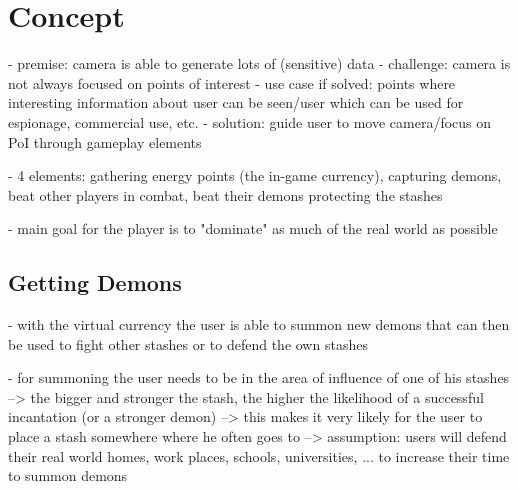 
\section{Concept}
\label{sec:concept}

- premise: camera is able to generate lots of (sensitive) data
- challenge: camera is not always focused on points of interest
- use case if solved: points where interesting information about user can be seen/user which can be used for espionage, commercial use, etc.
- solution: guide user to move camera/focus on PoI through gameplay elements



- 4 elements: gathering energy points (the in-game currency), capturing demons, beat other players in combat, beat their demons protecting the stashes

- main goal for the player is to "dominate" as much of the real world as possible



\subsection{Getting Demons}
\label{subsec:demons}

- with the virtual currency the user is able to summon new demons that can then be used to fight other stashes or to defend the own stashes

- for summoning the user needs to be in the area of influence of one of his stashes --> the bigger and stronger the stash, the higher the likelihood of a successful incantation (or a stronger demon)
--> this makes it very likely for the user to place a stash somewhere where he often goes to 
--> assumption: users will defend their real world homes, work places, schools, universities, ... to increase their time to summon demons

